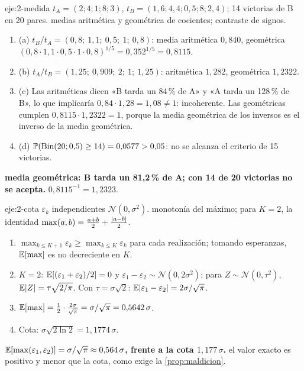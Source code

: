 \begin{solucion}{eje:2-medida}
\datos $t_A=(2;4;1;8;3)$, $t_B=(1{,}6;4{,}4;0{,}5;8;2{,}4)$; 14 victorias de B en 20 pares.
\planteamiento medias aritmética y geométrica de cocientes; contraste de signos.
\pasos
\begin{enumerate}[label=\arabic*.]
  \item (a) $t_B/t_A=(0{,}8;\ 1{,}1;\ 0{,}5;\ 1;\ 0{,}8)$: media aritmética $0{,}840$, geométrica $(0{,}8\cdot1{,}1\cdot0{,}5\cdot1\cdot0{,}8)^{1/5}=0{,}352^{1/5}=0{,}8115$.
  \item (b) $t_A/t_B=(1{,}25;\ 0{,}909;\ 2;\ 1;\ 1{,}25)$: aritmética $1{,}282$, geométrica $1{,}2322$.
  \item (c) Las aritméticas dicen «B tarda un 84\,\% de A» y «A tarda un 128\,\% de B», lo que implicaría $0{,}84\cdot1{,}28=1{,}08\ne1$: incoherente. Las geométricas cumplen $0{,}8115\cdot1{,}2322=1$, porque la media geométrica de los inversos es el inverso de la media geométrica.
  \item (d) $\mathbb{P}(\text{Bin}(20;0{,}5)\ge14)=0{,}0577>0{,}05$: no se alcanza el criterio de 15 victorias.
\end{enumerate}
\resultado \textbf{media geométrica: B tarda un 81{,}2\,\% de A; con 14 de 20 victorias no se acepta.}
\comprobacion $0{,}8115^{-1}=1{,}2323$.
\end{solucion}

\begin{solucion}{eje:2-cota}
\datos $\varepsilon_k$ independientes $\mathcal{N}(0,\sigma^{2})$.
\planteamiento monotonía del máximo; para $K=2$, la identidad $\max(a,b)=\frac{a+b}2+\frac{\lvert a-b\rvert}2$.
\pasos
\begin{enumerate}[label=\arabic*.]
  \item $\max_{k\le K+1}\varepsilon_k\ge\max_{k\le K}\varepsilon_k$ para cada realización; tomando esperanzas, $\mathbb{E}[\max]$ es no decreciente en $K$.
  \item $K=2$: $\mathbb{E}[(\varepsilon_1+\varepsilon_2)/2]=0$ y $\varepsilon_1-\varepsilon_2\sim\mathcal{N}(0,2\sigma^{2})$; para $Z\sim\mathcal{N}(0,\tau^{2})$, $\mathbb{E}\lvert Z\rvert=\tau\sqrt{2/\pi}$. Con $\tau=\sigma\sqrt2$: $\mathbb{E}\lvert\varepsilon_1-\varepsilon_2\rvert=2\sigma/\sqrt\pi$.
  \item $\mathbb{E}[\max]=\frac12\cdot\frac{2\sigma}{\sqrt\pi}=\sigma/\sqrt\pi=0{,}5642\,\sigma$.
  \item Cota: $\sigma\sqrt{2\ln2}=1{,}1774\,\sigma$.
\end{enumerate}
\resultado \textbf{$\mathbb{E}[\max(\varepsilon_1,\varepsilon_2)]=\sigma/\sqrt\pi\approx0{,}564\,\sigma$, frente a la cota $1{,}177\,\sigma$.}
\comprobacion el valor exacto es positivo y menor que la cota, como exige la \cref{prop:maldicion}.
\end{solucion}

